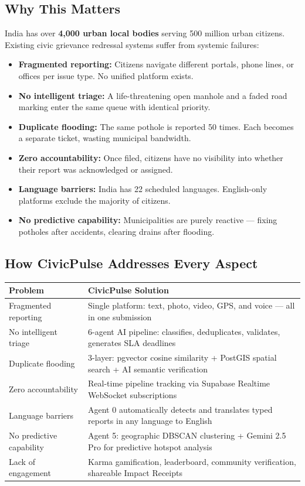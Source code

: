 \documentclass[11pt,a4paper]{article}
\newcommand{\thead}[1]{{\color{white}\bfseries\sffamily #1}}
\begin{document}
\subsection{Why This Matters}

India has over \textbf{4,000 urban local bodies} serving 500 million urban citizens. Existing civic grievance redressal systems suffer from systemic failures:

\begin{itemize}
  \item \textbf{Fragmented reporting:} Citizens navigate different portals, phone lines, or offices per issue type. No unified platform exists.
  \item \textbf{No intelligent triage:} A life-threatening open manhole and a faded road marking enter the same queue with identical priority.
  \item \textbf{Duplicate flooding:} The same pothole is reported 50 times. Each becomes a separate ticket, wasting municipal bandwidth.
  \item \textbf{Zero accountability:} Once filed, citizens have no visibility into whether their report was acknowledged or assigned.
  \item \textbf{Language barriers:} India has 22 scheduled languages. English-only platforms exclude the majority of citizens.
  \item \textbf{No predictive capability:} Municipalities are purely reactive — fixing potholes after accidents, clearing drains after flooding.
\end{itemize}

\subsection{How CivicPulse Addresses Every Aspect}

\begin{tabularx}{\linewidth}{@{} L{4.2cm} X @{}}
\toprule
{}
\thead{Problem} & \thead{CivicPulse Solution} \\
\midrule
Fragmented reporting     & Single platform: text, photo, video, GPS, and voice — all in one submission \\
No intelligent triage    & 6-agent AI pipeline: classifies, deduplicates, validates, generates SLA deadlines \\
Duplicate flooding       & 3-layer: pgvector cosine similarity + PostGIS spatial search + AI semantic verification \\
Zero accountability      & Real-time pipeline tracking via Supabase Realtime WebSocket subscriptions \\
Language barriers        & Agent 0 automatically detects and translates typed reports in any language to English \\
No predictive capability & Agent 5: geographic DBSCAN clustering + Gemini 2.5 Pro for predictive hotspot analysis \\
Lack of engagement       & Karma gamification, leaderboard, community verification, shareable Impact Receipts \\
\bottomrule
\end{tabularx}
\end{document}

